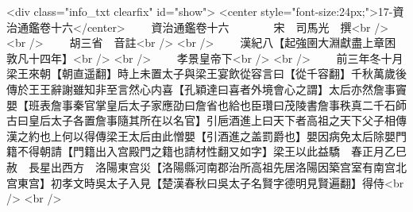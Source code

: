 <div class="info_txt clearfix" id="show">
<center style="font-size:24px;">17-資治通鑑卷十六</center>
  　　資治通鑑卷十六　　　　宋　司馬光　撰<br />
<br />
　　胡三省　音註<br />
<br />
　　漢紀八【起強圉大淵獻盡上章困敦凡十四年】<br />
<br />
　　孝景皇帝下<br />
<br />
　　前三年冬十月梁王來朝【朝直遥翻】時上未置太子與梁王宴飲從容言曰【從千容翻】千秋萬歲後傳於王王辭謝雖知非至言然心内喜【孔穎達曰喜者外境會心之謂】太后亦然詹事竇嬰【班表詹事秦官掌皇后太子家應劭曰詹省也給也臣瓚曰茂陵書詹事秩真二千石師古曰皇后太子各置詹事隨其所在以名官】引巵酒進上曰天下者高祖之天下父子相傳漢之約也上何以得傳梁王太后由此憎嬰【引酒進之盖罰爵也】嬰因病免太后除嬰門籍不得朝請【門籍出入宫殿門之籍也請材性翻又如字】梁王以此益驕　春正月乙巳赦　長星出西方　洛陽東宫災【洛陽縣河南郡治所高祖先居洛陽因築宫室有南宫北宫東宫】初孝文時吳太子入見【楚漢春秋曰吳太子名賢字德明見賢遍翻】得侍<br />
<br />
